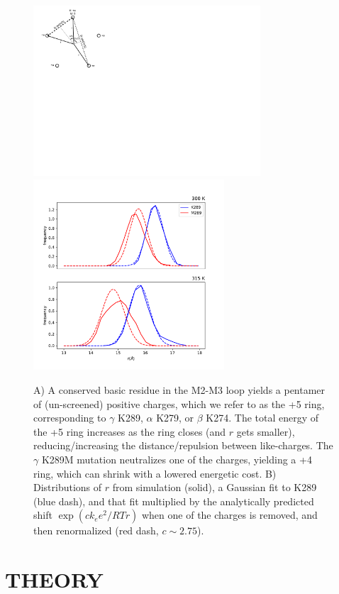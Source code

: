 \documentclass[12pt,onecolumn]{biophys}
\begin{document}
\begin{figure}[htbp]
\begin{center}
\includegraphics[height=2.5in]{figures/diagram.pdf}
\hspace{0.5in}
\includegraphics[height=2.8in]{figures/r_dist_predict.pdf}
\caption{A) A conserved basic residue in the M2-M3 loop yields a pentamer of (un-screened) positive charges, which we refer to as the +5 ring,  corresponding to $\gamma$ K289, $\alpha$ K279, or $\beta$ K274.  The total energy of the +5 ring increases as the ring closes (and $r$ gets smaller), reducing/increasing the distance/repulsion between like-charges. The $\gamma$ K289M mutation neutralizes one of the charges, yielding a +4 ring, which can shrink with a lowered energetic cost.  B) Distributions of $r$ from simulation (solid), a Gaussian fit to K289 (blue dash),  and that fit multiplied by the analytically predicted shift $\exp({c k_{e}e^{2}}/{RTr} )$ when one of the charges is removed, and then renormalized (red dash,  $c \sim 2.75$).
\label{fig:diagram}}
\end{center}
\end{figure}

\section{THEORY\label{sec:theory}}
\end{document}

